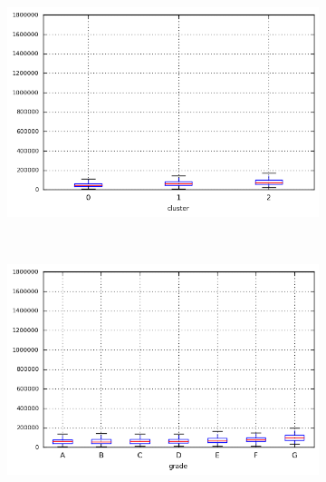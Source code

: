 \begin{anexosenv}
\begin{figure}[t!]
\begin{subfigure}[t]{0.45\textwidth}
            \centerline{\includegraphics[width=1\textwidth]{img/annual_inc_by_cluster}}
        \end{subfigure}%
        ~ 
        \begin{subfigure}[t]{0.45\textwidth}
            \centering
   
            \centerline{\includegraphics[width=1\textwidth]{img/annual_inc_by_grade}}

        \end{subfigure}
        \\
                \caption{\emph{Boxplots} de delinq\textunderscore 2yrs}
        \begin{subfigure}[t]{0.45\textwidth}
            \centering


\end{subfigure}
\end{figure}
\end{anexosenv}
